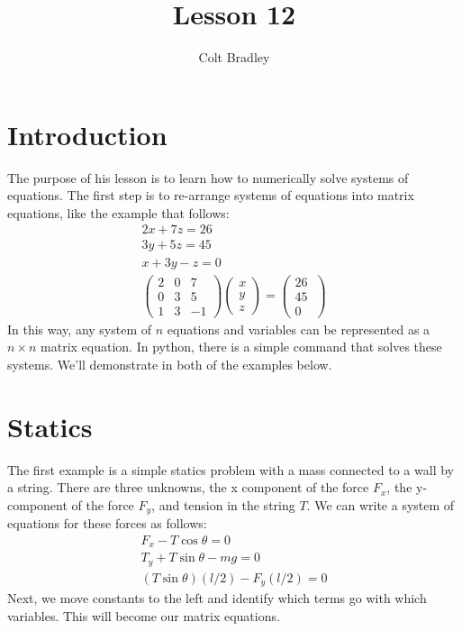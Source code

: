 \documentclass[11pt]{article}
\begin{document}
\title{Lesson 12}
\author{Colt Bradley}
\date{}
\maketitle

\section{Introduction}
The purpose of his lesson is to learn how to numerically solve systems of equations. The first step is to re-arrange systems of equations into matrix equations, like the example that follows:
\begin{subequations}
\begin{align}
2x +7z = 26 \\
3y +5z = 45 \\
x+3y-z = 0 \\
 \left( \begin{array}{ccc}
2 & 0 & 7 \\
0 & 3 & 5 \\
1 & 3 & -1 \end{array} \right)
 \left( \begin{array}{ccc}
x \\
y \\
z \end{array} \right) = 
 \left( \begin{array}{ccc}
26\ \\
45 \\
0\end{array} \right)
\end{align}
\end{subequations} 
In this way, any system of $n$ equations and variables can be represented as a $n \times n$ matrix equation. In python, there is a simple command that solves these systems. We'll demonstrate in both of the examples below. 

\section{Statics}
The first example is a simple statics problem with a mass connected to a wall by a string. There are three unknowns, the x component of the force $F_x$, the y-component of the force $F_y$, and tension in the string $T$. We can write a system of equations for these forces as follows:   
\begin{subequations}
\begin{align}
F_x - T \cos\theta = 0 \\
T_y + T \sin \theta - mg = 0 \\
(T \sin \theta)(l / 2) - F_y(l/2)= 0
\end{align}
\end{subequations}
Next, we move constants to the left and identify which terms go with which variables. This will become our matrix equations. 
\end{document}
